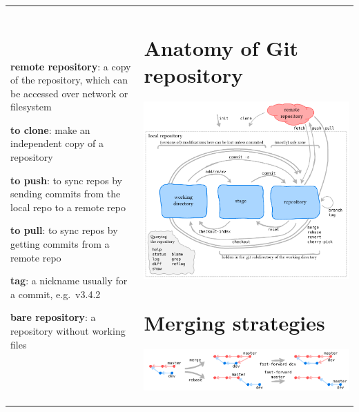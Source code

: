 \documentclass[landscape]{article}
\begin{document}
\begin{tabular*}{1\textwidth}{@{\extracolsep{\fill}} p{} p{}}
\begin{minipage}[t]{0.315\textwidth}
\begin{myitemize}
  \item \textbf{remote repository}: a copy of the repository, which can be accessed over network or filesystem
  \item \textbf{to clone}: make an independent copy of a repository
  \item \textbf{to push}: to sync repos by sending commits from the local repo to a remote repo
  \item \textbf{to pull}: to sync repos by getting commits from a remote repo
  \item \textbf{tag}: a nickname usually for a commit, e.g.\ v3.4.2
  \item \textbf{bare repository}: a repository without working files
  \end{myitemize}
\end{minipage}
&
\begin{minipage}[t]{0.6\textwidth}
  \section{Anatomy of Git repository}
  \vspace{-10mm}
  \includegraphics[scale=1.1]{gitflow} 
  \section{Merging strategies}
  \vspace{-5mm}
  \includegraphics[scale=1.1]{merging} 
\end{minipage}
\end{tabular*}
\end{document}
